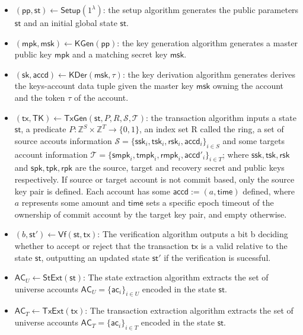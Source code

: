     \begin{itemize}
        \item $(\mathsf{pp,st}) \gets \mathsf{Setup}(1^\lambda)$: the setup algorithm generates the public parameters $\mathsf{st}$ and an initial global state $\mathsf{st}$.
        \item $(\mathsf{mpk},\mathsf{msk}) \gets \mathsf{KGen}(\mathsf{pp})$: the key generation algorithm generates a master public key $\mathsf{mpk}$ and a matching secret key $\mathsf{msk}$.
        \item $(\mathsf{sk},\mathsf{accd}) \gets \mathsf{KDer}(\mathsf{msk, \tau})$: the key derivation algorithm generates derives the keys-account data tuple given the master key $\mathsf{msk}$ owning the account and the token $\tau$ of the account.
        \item $(\mathsf{tx,TK}) \gets \mathsf{TxGen}(\mathsf{st},P,R,\mathcal{S},\mathcal{T})$: the transaction algorithm inputs a state $\mathsf{st}$, a predicate $P: \mathbb{Z}^S \times \mathbb{Z}^T \rightarrow \{0,1\}$, an index set R called the ring, a set of source accouts information $\mathcal{S} = \{\mathsf{ssk}_i, \mathsf{tsk}_i, \mathsf{rsk}_i, \mathsf{accd}_i\}_{i\in S}$ and some targets account information $\mathcal{T} = \{\mathsf{smpk}_i, \mathsf{tmpk}_i, \mathsf{rmpk}_i, \mathsf{accd}'_i\}_{i\in T}$; where $\mathsf{ssk,tsk,rsk}$ and $\mathsf{spk,tpk,rpk}$ are the source, target and recovery secret and public keys respectively. If source or target account is not commit based, only the source key pair is defined. Each account has some $\mathsf{accd} := (a,\mathsf{time})$ defined, where $a$ represents some amount and $\mathsf{time}$ sets a specific epoch timeout of the ownership of commit account by the target key pair, and empty otherwise. 
        \item $(b,\mathsf{st}') \gets \mathsf{Vf}(\mathsf{st,tx})$: The verification algorithm outputs a bit b deciding whether to accept or reject that the transaction $\mathsf{tx}$ is a valid relative to the state $\mathsf{st}$, outputting an updated state $\mathsf{st}'$ if the verification is sucessful.
    \item $\mathsf{AC}_U \gets \mathsf{StExt}(\mathsf{st})$: The state extraction algorithm
    extracts the set of universe accounts $\mathsf{AC}_U = \{\mathsf{ac}_i\}_{i \in U}$ encoded in the state $\mathsf{st}$.
    \item $\mathsf{AC}_T \gets \mathsf{TxExt}(\mathsf{tx})$: The transaction extraction algorithm
    extracts the set of universe accounts $\mathsf{AC}_T = \{\mathsf{ac}_i\}_{i \in T}$ encoded in the state $\mathsf{st}$.

\end{itemize}
